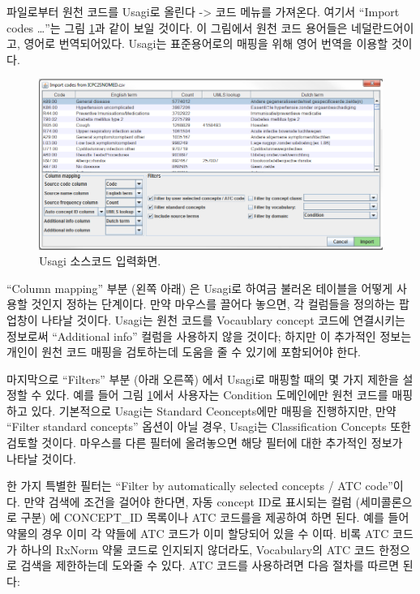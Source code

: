 \documentclass[11pt]{book}
\theoremstyle{definition}
\theoremstyle{definition}
\theoremstyle{definition}
\theoremstyle{remark}
\begin{document}
파일로부터 원천 코드를 Usagi로 올린다 -\textgreater{} 코드 메뉴를
가져온다. 여기서 ``Import codes \ldots{}''는 그림
\ref{fig:usagiImport}과 같이 보일 것이다. 이 그림에서 원천 코드 용어들은
네덜란드어이고, 영어로 번역되어있다. Usagi는 표준용어로의 매핑을 위해
영어 번역을 이용할 것이다.

\begin{figure}

{\centering \includegraphics[width=1\linewidth]{images/ExtractTransformLoad/usagiImport} 

}

\caption{Usagi 소스코드 입력화면.}\label{fig:usagiImport}
\end{figure}

``Column mapping'' 부분 (왼쪽 아래) 은 Usagi로 하여금 불러온 테이블을
어떻게 사용할 것인지 정하는 단계이다. 만약 마우스를 끌어다 놓으면, 각
컬럼들을 정의하는 팝업창이 나타날 것이다. Usagi는 원천 코드를 Vocaublary
concept 코드에 연결시키는 정보로써 ``Additional info'' 컬럼을 사용하지
않을 것이다; 하지만 이 추가적인 정보는 개인이 원천 코드 매핑을
검토하는데 도움을 줄 수 있기에 포함되어야 한다.

마지막으로 ``Filters'' 부분 (아래 오른쪽) 에서 Usagi로 매핑할 때의 몇
가지 제한을 설정할 수 있다. 예를 들어 그림 \ref{fig:usagiImport}에서
사용자는 Condition 도메인에만 원천 코드를 매핑하고 있다. 기본적으로
Usagi는 Standard Ceoncepts에만 매핑을 진행하지만, 만약 ``Filter standard
concepts'' 옵션이 아닐 경우, Usagi는 Classification Concepts 또한 검토할
것이다. 마우스를 다른 필터에 올려놓으면 해당 필터에 대한 추가적인 정보가
나타날 것이다.

한 가지 특별한 필터는 ``Filter by automatically selected concepts / ATC
code''이다. 만약 검색에 조건을 걸어야 한다면, 자동 concept ID로 표시되는
컬럼 (세미콜론으로 구분) 에 CONCEPT\_ID 목록이나 ATC 코드를을 제공하여
하면 된다. 예를 들어 약물의 경우 이미 각 약들에 ATC 코드가 이미 할당되어
있을 수 이따. 비록 ATC 코드가 하나의 RxNorm 약물 코드로 인지되지
않더라도, Vocabulary의 ATC 코드 한정으로 검색을 제한하는데 도와줄 수
있다. ATC 코드를 사용하려면 다음 절차를 따르면 된다:
\end{document}
